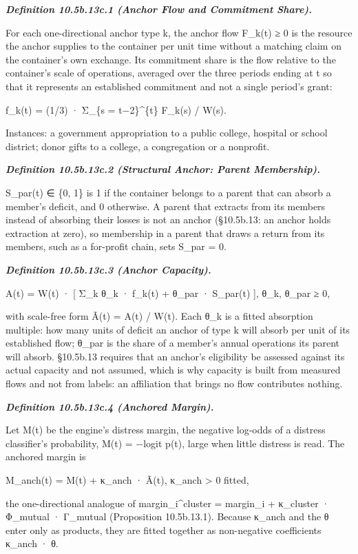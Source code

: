 \documentclass[
]{article}
\begin{document}
\emph{\textbf{Definition 10.5b.13c.1 (Anchor Flow and Commitment
Share).}}

For each one-directional anchor type k, the anchor flow F\_k(t) ≥ 0 is
the resource the anchor supplies to the container per unit time without
a matching claim on the container's own exchange. Its commitment share
is the flow relative to the container's scale of operations, averaged
over the three periods ending at t so that it represents an established
commitment and not a single period's grant:

f\_k(t) = (1/3) · Σ\_\{s = t−2\}\^{}\{t\} F\_k(s) / W(s).

Instances: a government appropriation to a public college, hospital or
school district; donor gifts to a college, a congregation or a
nonprofit.

\emph{\textbf{Definition 10.5b.13c.2 (Structural Anchor: Parent
Membership).}}

S\_par(t) ∈ \{0, 1\} is 1 if the container belongs to a parent that can
absorb a member's deficit, and 0 otherwise. A parent that extracts from
its members instead of absorbing their losses is not an anchor
(§10.5b.13: an anchor holds extraction at zero), so membership in a
parent that draws a return from its members, such as a for-profit chain,
sets S\_par = 0.

\emph{\textbf{Definition 10.5b.13c.3 (Anchor Capacity).}}

A(t) = W(t) · {[} Σ\_k θ\_k · f\_k(t) + θ\_par · S\_par(t) {]}, θ\_k,
θ\_par ≥ 0,

with scale-free form Ã(t) = A(t) / W(t). Each θ\_k is a fitted
absorption multiple: how many units of deficit an anchor of type k will
absorb per unit of its established flow; θ\_par is the share of a
member's annual operations its parent will absorb. §10.5b.13 requires
that an anchor's eligibility be assessed against its actual capacity and
not assumed, which is why capacity is built from measured flows and not
from labels: an affiliation that brings no flow contributes nothing.

\emph{\textbf{Definition 10.5b.13c.4 (Anchored Margin).}}

Let M(t) be the engine's distress margin, the negative log-odds of a
distress classifier's probability, M(t) = −logit p(t), large when little
distress is read. The anchored margin is

M\_anch(t) = M(t) + κ\_anch · Ã(t), κ\_anch \textgreater{} 0 fitted,

the one-directional analogue of margin\_i\^{}cluster = margin\_i +
κ\_cluster · Φ\_mutual · Γ\_mutual (Proposition 10.5b.13.1). Because
κ\_anch and the θ enter only as products, they are fitted together as
non-negative coefficients κ\_anch · θ.
\end{document}
